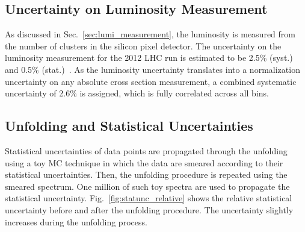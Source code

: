 \subsection {Uncertainty on Luminosity Measurement}
\label{sec:luminosity_uncertainty}

As discussed in Sec.~\ref{sec:lumi_measurement}, the luminosity is measured from
the number of clusters in the silicon pixel detector. The uncertainty on the
luminosity measurement for the 2012 LHC run is estimated to be 2.5\% (syst.) and
0.5\% (stat.)~\cite{CMS-PAS-LUM-13-001}. As the luminosity uncertainty
translates into a normalization uncertainty on any absolute cross section
measurement, a combined systematic uncertainty of 2.6\% is assigned, which is
fully correlated across all bins.

\subsection{Unfolding and Statistical Uncertainties}
\label{sec:stat_unf_uncert}

Statistical uncertainties of data points are propagated through the unfolding
using a toy MC technique in which the data are smeared according to
their statistical uncertainties. Then, the unfolding procedure is repeated using
the smeared spectrum. One million of such toy spectra are used to
propagate the statistical uncertainty. Fig.~\ref{fig:statunc_relative} shows
the relative statistical uncertainty before and after the unfolding procedure.
The uncertainty slightly increases during the unfolding process.

